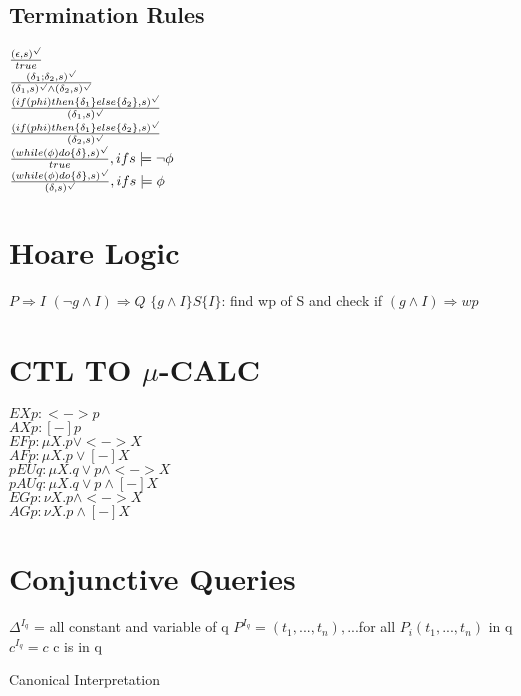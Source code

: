 \documentclass{article}
\begin{document}
\subsection{Termination Rules}
$\frac{(\epsilon,s)^{\surd}}{true}$\\[2mm]
$\frac{(\delta_1;\delta_2,s)^{\surd}}{(\delta_1,s)^{\surd}\wedge(\delta_2,s)^{\surd}}$\\[2mm]
$\frac{(if(\\phi)then\{\delta_1\}else\{\delta_2\},s)^{\surd}}{(\delta_1,s)^{\surd}}$\\[2mm]
$\frac{(if(\\phi)then\{\delta_1\}else\{\delta_2\},s)^{\surd}}{(\delta_2,s)^{\surd}}$\\[2mm]
$\frac{(while(\phi)do\{\delta\},s)^{\surd}}{true}, if s\models\neg\phi$\\[2mm]
$\frac{(while(\phi)do\{\delta\},s)^{\surd}}{(\delta,s)^{\surd}}, if s\models\phi$\\[2mm]
\section{Hoare Logic}
$P\Rightarrow I$ \newline
$(\neg g \wedge I)\Rightarrow Q$ \newline
$\{g \wedge I\}S\{I\}$: find wp of S and check if $(g \wedge I)\Rightarrow wp$

\section{CTL TO $\mu$-CALC}
$EX p: <->p$\\
$AX p: [-]p$\\
$EF p: \mu X.p\vee<->X $\\
$AFp: \mu X.p\vee[-]X $\\
$pEUq: \mu X. q\vee p \wedge <->X $\\
$pAUq: \mu X. q\vee p \wedge [-]X $\\
$EGp: \nu X.p\wedge<->X$\\
$AGp: \nu X.p\wedge[-]X$\\

\section{Conjunctive Queries}

	\begin{algorithm}
		$\Delta^{I_q}$ = all constant and variable of q \;
		$P^{I_q}={(t_1,...,t_n),...} $for all $P_i(t_1,...,t_n)$ in q\;
		$c^{I_q}=c$ c is in q \;
		\caption{Canonical Interpretation}
	\end{algorithm}
\end{document}
